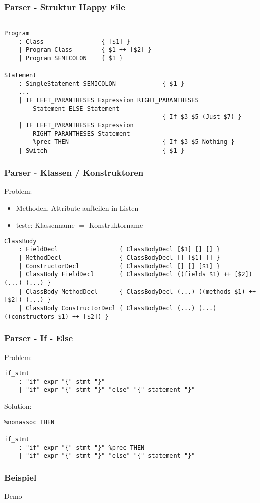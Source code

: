 \begin{frame}[fragile]
	\frametitle{Parser - Struktur Happy File}
	\begin{lstlisting}[basicstyle=\tiny]
		
Program
    : Class                { [$1] }
    | Program Class        { $1 ++ [$2] }
    | Program SEMICOLON    { $1 }

Statement
    : SingleStatement SEMICOLON             { $1 }
	...
    | IF LEFT_PARANTHESES Expression RIGHT_PARANTHESES
        Statement ELSE Statement
                                            { If $3 $5 (Just $7) }
    | IF LEFT_PARANTHESES Expression
        RIGHT_PARANTHESES Statement
        %prec THEN                          { If $3 $5 Nothing }
    | Switch                                { $1 }
	\end{lstlisting}
\end{frame}

\begin{frame}[fragile]
	\frametitle{Parser - Klassen / Konstruktoren}
	Problem:
	\begin{itemize}
		\item Methoden, Attribute aufteilen in Listen
		\item teste: Klassenname $=$ Konstruktorname
	\end{itemize}
	\pause

	\begin{lstlisting}[basicstyle=\tiny]
ClassBody
    : FieldDecl                 { ClassBodyDecl [$1] [] [] }
    | MethodDecl                { ClassBodyDecl [] [$1] [] }
    | ConstructorDecl           { ClassBodyDecl [] [] [$1] }
    | ClassBody FieldDecl       { ClassBodyDecl ((fields $1) ++ [$2]) (...) (...) }
    | ClassBody MethodDecl      { ClassBodyDecl (...) ((methods $1) ++ [$2]) (...) }
    | ClassBody ConstructorDecl { ClassBodyDecl (...) (...) ((constructors $1) ++ [$2]) }
	\end{lstlisting}
\end{frame}

\begin{frame}[fragile]
	\frametitle{Parser - If - Else}
	Problem:
	\begin{lstlisting}
if_stmt
    : "if" expr "{" stmt "}"
    | "if" expr "{" stmt "}" "else" "{" statement "}"
	\end{lstlisting}
	\pause
	Solution:

	\begin{lstlisting}
%nonassoc THEN

if_stmt
    : "if" expr "{" stmt "}" %prec THEN
    | "if" expr "{" stmt "}" "else" "{" statement "}"
	\end{lstlisting}
\end{frame}

\begin{frame}[fragile]
	\frametitle{Beispiel}
	\begin{center}
		\Huge Demo
	\end{center}
\end{frame}
